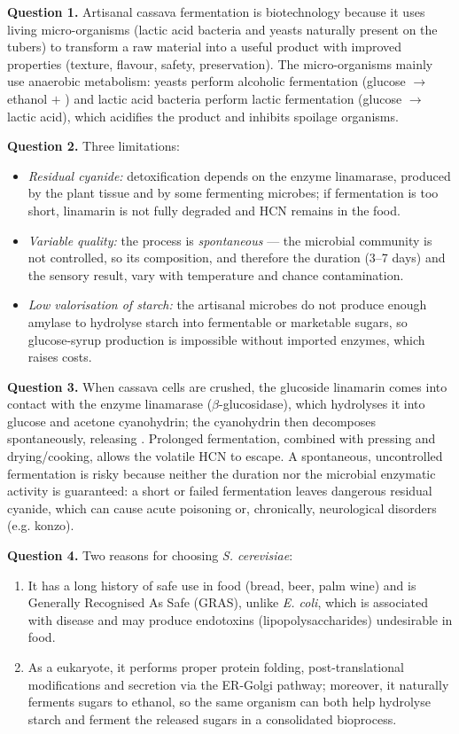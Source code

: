 \documentclass[11pt]{article}
\newcommand{\cle}[1]{{\popxbold\color{popdark}#1}}
\newcounter{popsec}
\newcounter{popsub}
\newcommand{\courssub}[1]{%
  \stepcounter{popsub}%
  \par\vspace{9pt}\noindent{\popxbold\fontsize{11.5}{13}\selectfont\color{popink}{\color{poporange}\thepopsec.\thepopsub}\hspace{6pt}#1}\par\nopagebreak\vspace{4pt}
}
\begin{document}
\courssub{Model answer}

\textbf{Question 1.} Artisanal cassava fermentation is biotechnology because it uses \cle{living micro-organisms} (lactic acid bacteria and yeasts naturally present on the tubers) to transform a raw material into a useful product with improved properties (texture, flavour, safety, preservation). The micro-organisms mainly use \cle{anaerobic metabolism}: yeasts perform alcoholic fermentation (glucose $\rightarrow$ ethanol $+$ ) and lactic acid bacteria perform lactic fermentation (glucose $\rightarrow$ lactic acid), which acidifies the product and inhibits spoilage organisms.

\textbf{Question 2.} Three limitations:
\begin{itemize}
\item \emph{Residual cyanide:} detoxification depends on the enzyme linamarase, produced by the plant tissue and by some fermenting microbes; if fermentation is too short, linamarin is not fully degraded and HCN remains in the food.
\item \emph{Variable quality:} the process is \emph{spontaneous} --- the microbial community is not controlled, so its composition, and therefore the duration (3--7 days) and the sensory result, vary with temperature and chance contamination.
\item \emph{Low valorisation of starch:} the artisanal microbes do not produce enough amylase to hydrolyse starch into fermentable or marketable sugars, so glucose-syrup production is impossible without imported enzymes, which raises costs.
\end{itemize}

\textbf{Question 3.} When cassava cells are crushed, the glucoside linamarin comes into contact with the enzyme linamarase ($\beta$-glucosidase), which hydrolyses it into glucose and acetone cyanohydrin; the cyanohydrin then decomposes spontaneously, releasing . Prolonged fermentation, combined with pressing and drying/cooking, allows the volatile HCN to escape. A spontaneous, uncontrolled fermentation is risky because neither the duration nor the microbial enzymatic activity is guaranteed: a short or failed fermentation leaves dangerous residual cyanide, which can cause acute poisoning or, chronically, neurological disorders (e.g. konzo).

\textbf{Question 4.} Two reasons for choosing \emph{S. cerevisiae}:
\begin{enumerate}
\item It has a long history of safe use in food (bread, beer, palm wine) and is \cle{Generally Recognised As Safe (GRAS)}, unlike \emph{E. coli}, which is associated with disease and may produce endotoxins (lipopolysaccharides) undesirable in food.
\item As a eukaryote, it performs proper protein folding, post-translational modifications and \cle{secretion} via the ER-Golgi pathway; moreover, it naturally ferments sugars to ethanol, so the same organism can both help hydrolyse starch and ferment the released sugars in a consolidated bioprocess.
\end{enumerate}
\end{document}
